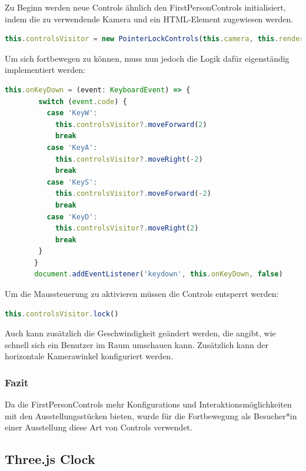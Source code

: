 Zu Beginn werden neue Controls ähnlich den FirstPersonControls initialisiert, indem die zu verwendende Kamera und ein HTML-Element zugewiesen werden.
\begin{lstlisting}[caption={PointerLockControls initialisieren},language=TypeScript]
    this.controlsVisitor = new PointerLockControls(this.camera, this.renderer.domElement)
    \end{lstlisting}

Um sich fortbewegen zu können, muss nun jedoch die Logik dafür eigenständig implementiert werden: 

\begin{lstlisting}[caption={Logik der PointerLockControls},language=TypeScript]
    this.onKeyDown = (event: KeyboardEvent) => {
        switch (event.code) {
          case 'KeyW':
            this.controlsVisitor?.moveForward(2)
            break
          case 'KeyA':
            this.controlsVisitor?.moveRight(-2)
            break
          case 'KeyS':
            this.controlsVisitor?.moveForward(-2)
            break
          case 'KeyD':
            this.controlsVisitor?.moveRight(2)
            break
        }
       }
       document.addEventListener('keydown', this.onKeyDown, false)
    \end{lstlisting}

Um die Maussteuerung zu aktivieren müssen die Controls entsperrt werden:

\begin{lstlisting}[caption={Controls entsperren},language=TypeScript]
    this.controlsVisitor.lock()
    \end{lstlisting}

Auch kann zusätzlich die Geschwindigkeit geändert werden, die angibt, wie schnell sich ein Benutzer im Raum umschauen kann. Zusätzlich kann der horizontale Kamerawinkel konfiguriert werden.

\subsubsection{Fazit}
Da die FirstPersonControls mehr Konfigurations und Interaktionsmöglichkeiten mit den Ausstellungsstücken bieten, wurde für die Fortbewegung als Besucher*in einer Ausstellung diese Art von Controls verwendet.\cite{PointerLockControls}


\subsection{Three.js Clock}
\label{Clock}

